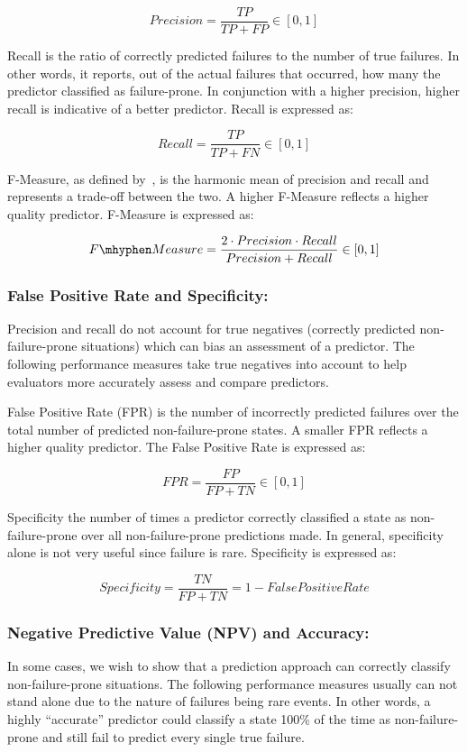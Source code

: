 \[ Precision 
	= \dfrac{TP}{TP + FP} \in [0,1]
\]

Recall is the ratio of correctly predicted failures to the number of true
failures.  In other words, it reports, out of the actual failures that
occurred, how many the predictor classified as failure-prone.  In conjunction
with a higher precision, higher recall is indicative of a better predictor.
Recall is expressed as:

\[ Recall 
	= \dfrac{TP}{TP + FN} \in [0,1]
\]

F-Measure, as defined by~\cite{rijsbergen1979v}, is the harmonic mean of
precision and recall and represents a trade-off between the two.  A higher
F-Measure reflects a higher quality predictor.  F-Measure is expressed as:

\[ F\mhyphen Measure 
	= \dfrac{2 \cdot Precision \cdot Recall}{Precision + Recall} \in [0,1]
\]

\subsubsection{False Positive Rate and Specificity:}
Precision and recall do not account for true negatives (correctly predicted
non-failure-prone situations) which can bias an assessment of a predictor.  The
following performance measures take true negatives into account to help
evaluators more accurately assess and compare predictors.

False Positive Rate (FPR) is the number of incorrectly predicted failures over
the total number of predicted non-failure-prone states.  A smaller FPR reflects
a higher quality predictor.  The False Positive Rate is expressed as:

\[ \mathit{FPR}
	= \dfrac{FP}{FP + TN} \in [0,1]
\]

Specificity the number of times a predictor correctly classified a state as
non-failure-prone over all non-failure-prone predictions made.  In general,
specificity alone is not very useful since failure is rare.  Specificity is
expressed as:

\[ Specificity 
	= \dfrac{TN}{FP + TN} = 1 - False Positive Rate
\]

\subsubsection{Negative Predictive Value (NPV) and Accuracy:}
In some cases, we wish to show that a prediction approach can correctly
classify non-failure-prone situations.  The following performance measures 
usually can not stand alone due to the nature of failures being rare events.
In other words, a highly ``accurate'' predictor could classify a state 100\% of
the time as non-failure-prone and still fail to predict every single true
failure.

